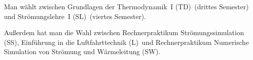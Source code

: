 Man wählt zwischen \glqq Grundlagen der Thermodynamik~I (TD)\grqq\ (drittes Semester)
und \glqq Strömungslehre~I (SL)\grqq\ (viertes Semester).

Außerdem hat man die Wahl zwischen
\glqq Rechnerpraktikum Strömungssimulation (SS)\grqq,
\glqq Einführung in die Luftfahrttechnik (L)\grqq\ 
und \glqq Rechnerpraktikum Numerische Simulation
von Strömung und Wärmeleitung (SW)\grqq.


